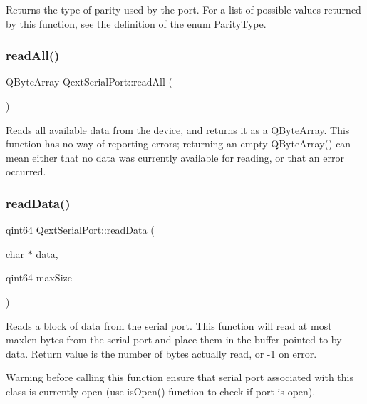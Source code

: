 Returns the type of parity used by the port. For a list of possible values returned by this function, see the definition of the enum Parity\+Type. \mbox{\label{classQextSerialPort_a5ea5a8f38a40490e655231bd083ca51d}} 
\subsubsection{\texorpdfstring{read\+All()}{readAll()}}
{\footnotesize\ttfamily Q\+Byte\+Array Qext\+Serial\+Port\+::read\+All (\begin{DoxyParamCaption}{ }\end{DoxyParamCaption})}

Reads all available data from the device, and returns it as a Q\+Byte\+Array. This function has no way of reporting errors; returning an empty Q\+Byte\+Array() can mean either that no data was currently available for reading, or that an error occurred. \mbox{\label{classQextSerialPort_a7bcf7ba45f4c02607ceca83d00f9def4}} 
\subsubsection{\texorpdfstring{read\+Data()}{readData()}}
{\footnotesize\ttfamily qint64 Qext\+Serial\+Port\+::read\+Data (\begin{DoxyParamCaption}\item[{char $\ast$}]{data,  }\item[{qint64}]{max\+Size }\end{DoxyParamCaption})\hspace{0.3cm}{\ttfamily [protected]}}

Reads a block of data from the serial port. This function will read at most maxlen bytes from the serial port and place them in the buffer pointed to by data. Return value is the number of bytes actually read, or -\/1 on error.

\begin{DoxyWarning}{Warning}
before calling this function ensure that serial port associated with this class is currently open (use is\+Open() function to check if port is open). 
\end{DoxyWarning}
\mbox{\label{classQextSerialPort_a034505ee74b7e53492adfe08cdc4ce6c}} 
